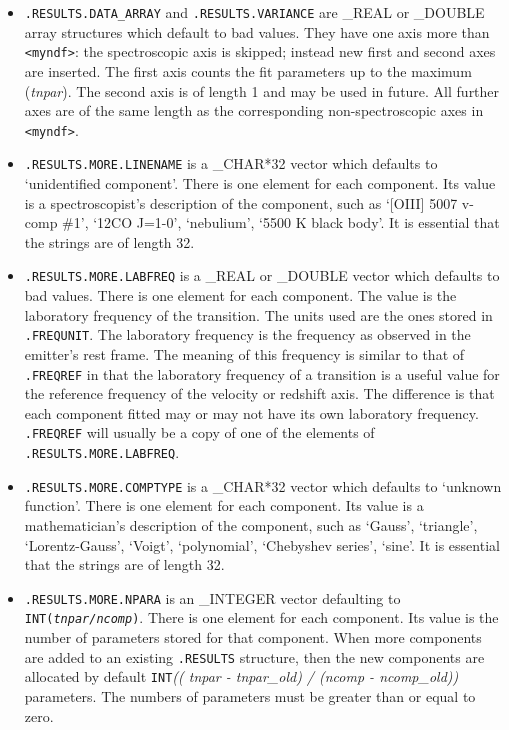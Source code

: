 \begin{itemize}

\item{\tt .RESULTS.DATA\_ARRAY} and {\tt .RESULTS.VARIANCE} are \_REAL
   or \_DOUBLE array structures which default to bad values. They have
   one axis more than {\tt <myndf>}: the spectroscopic axis is skipped;
   instead new first and second axes are inserted. The first axis counts
   the fit parameters up to the maximum ({\it tnpar}). The second axis
   is of length 1 and may be used in future. All further axes are of the
   same length as the corresponding non-spectroscopic axes in {\tt
   <myndf>}.

\item{\tt .RESULTS.MORE.LINENAME} is a \_CHAR*32 vector which defaults
   to `unidentified component'.  There is one element for each
   component.  Its value is a spectroscopist's description of the
   component, such as `[OIII] 5007 v-comp \#1', `12CO J=1-0',
   `nebulium', `5500 K black body'.  It is essential that the strings
   are of length 32.

\item{\tt .RESULTS.MORE.LABFREQ} is a \_REAL or \_DOUBLE vector which
   defaults to bad values. There is one element for each component. The
   value is the laboratory frequency of the transition. The units used
   are the ones stored in {\tt .FREQUNIT}. The laboratory frequency is the
   frequency as observed in the emitter's rest frame. The meaning of
   this frequency is similar to that of {\tt .FREQREF} in that the
   laboratory frequency of a transition is a useful value for the
   reference frequency of the velocity or redshift axis. The difference
   is that each component fitted may or may not have its own laboratory
   frequency. {\tt .FREQREF} will usually be a copy of one of the
   elements of {\tt .RESULTS.MORE.LABFREQ}.

\item{\tt .RESULTS.MORE.COMPTYPE} is a \_CHAR*32 vector which defaults
   to `unknown function'.  There is one element for each component.
   Its value is a mathematician's description of the component, such as
   `Gauss', `triangle', `Lorentz-Gauss', `Voigt', `polynomial',
   `Chebyshev series', `sine'.  It is essential that the strings are of
   length 32.

\item{\tt .RESULTS.MORE.NPARA} is an \_INTEGER vector defaulting to {\tt
   INT({\it tnpar/ncomp})}. There is one element for each component. Its
   value is the number of parameters stored for that component. When
   more components are added to an existing {\tt .RESULTS} structure,
   then the new components are allocated by default {\tt INT}{\it(( tnpar
   - tnpar\_old) / (ncomp - ncomp\_old))} parameters. The numbers of
   parameters must be greater than or equal to zero.


\end{itemize}
